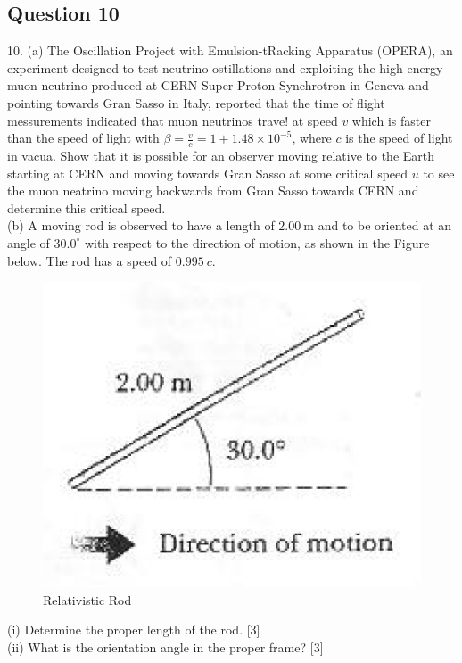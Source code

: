 \subsection{Question 10}
10. (a) The Oscillation Project with Emulsion-tRacking Apparatus (OPERA), an experiment designed to test neutrino ostillations and exploiting the high energy muon neutrino produced at CERN Super Proton Synchrotron in Geneva and pointing towards Gran Sasso in Italy, reported that the time of flight messurements indicated that muon neutrinos trave! at speed $v$ which is faster than the speed of light with $\beta=\frac{v}{c}=1+1.48 \times 10^{-5}$, where $c$ is the speed of light in vacua. Show that it is possible for an observer moving relative to the Earth starting at CERN and moving towards Gran Sasso at some critical speed $u$ to see the muon neatrino moving backwards from Gran Sasso towards CERN and determine this critical speed.\\
(b) A moving rod is observed to have a length of $2.00 \mathrm{~m}$ and to be oriented at an angle of $30.0^\circ$ with respect to the direction of motion, as shown in the Figure below. The rod has a speed of $0.995~c$.
\begin{figure}
	\centering
	\includegraphics[width=0.7\linewidth]{spho_book_TYS_images/2011q10.png}
	\caption{Relativistic Rod}
\end{figure}
(i) Determine the proper length of the rod. [3] \\
(ii) What is the orientation angle in the proper frame? [3] \\


